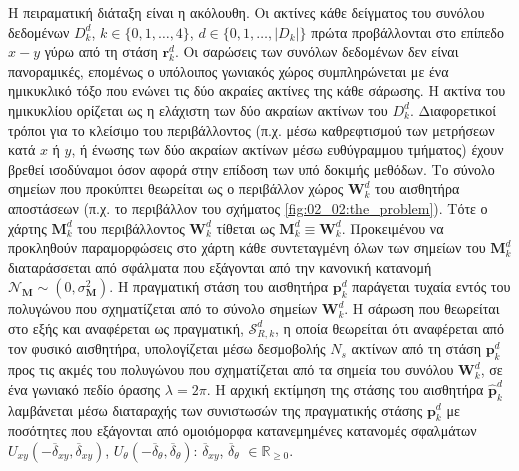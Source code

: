 Η πειραματική διάταξη είναι η ακόλουθη. Οι ακτίνες κάθε δείγματος του συνόλου
δεδομένων $D_k^d$, $k \in \{0,1,\dots,4\}$, $d \in \{0,1,\dots,|D_k|\}$ πρώτα
προβάλλονται στο επίπεδο $x-y$ γύρω από τη στάση $\bm{r}_k^d$. Οι σαρώσεις των
συνόλων δεδομένων δεν είναι πανοραμικές, επομένως ο υπόλοιπος γωνιακός χώρος
συμπληρώνεται με ένα ημικυκλικό τόξο που ενώνει τις δύο ακραίες ακτίνες της
κάθε σάρωσης. Η ακτίνα του ημικυκλίου ορίζεται ως η ελάχιστη των δύο ακραίων
ακτίνων του $D_k^d$. Διαφορετικοί τρόποι για το κλείσιμο του περιβάλλοντος
(π.χ.  μέσω καθρεφτισμού των μετρήσεων κατά $x$ ή $y$, ή ένωσης των δύο ακραίων
ακτίνων μέσω ευθύγραμμου τμήματος) έχουν βρεθεί ισοδύναμοι όσον αφορά στην
επίδοση των υπό δοκιμής μεθόδων. Το σύνολο σημείων που προκύπτει θεωρείται ως ο
περιβάλλον χώρος $\bm{W}_k^d$ του αισθητήρα αποστάσεων (π.χ.  το περιβάλλον του
σχήματος \ref{fig:02_02:the_problem}). Τότε ο χάρτης $\bm{M}_k^d$ του
περιβάλλοντος $\bm{W}_k^d$ τίθεται ως $\bm{M}_k^d \equiv \bm{W}_k^d$.
Προκειμένου να προκληθούν παραμορφώσεις στο χάρτη κάθε συντεταγμένη όλων των
σημείων του $\bm{M}_k^d$ διαταράσσεται από σφάλματα που εξάγονται από την
κανονική κατανομή $\mathcal{N}_{\bm{M}} \sim (0, \sigma_{\bm{M}}^2)$.  Η
πραγματική στάση του αισθητήρα $\bm{p}_k^d$ παράγεται τυχαία εντός του
πολυγώνου που σχηματίζεται από το σύνολο σημείων $\bm{W}_k^d$.  Η σάρωση που
θεωρείται στο εξής και αναφέρεται ως πραγματική, $\mathcal{S}_{R,k}^d$, η οποία
θεωρείται ότι αναφέρεται από τον φυσικό αισθητήρα, υπολογίζεται μέσω δεσμοβολής
$N_s$ ακτίνων από τη στάση $\bm{p}_k^d$ προς τις ακμές του πολυγώνου που
σχηματίζεται από τα σημεία του συνόλου $\bm{W}_k^d$, σε ένα γωνιακό πεδίο
όρασης $\lambda = 2\pi$. Η αρχική εκτίμηση της στάσης του αισθητήρα
$\hat{\bm{p}}_k^d$ λαμβάνεται μέσω διαταραχής των συνιστωσών της πραγματικής
στάσης $\bm{p}^d_k$ με ποσότητες που εξάγονται από ομοιόμορφα κατανεμημένες
κατανομές σφαλμάτων $U_{xy}(-\overline{\delta}_{xy}, \overline{\delta}_{xy})$,
$U_{\theta}(-\overline{\delta}_{\theta}, \overline{\delta}_{\theta})$:
$\overline{\delta}_{xy}$, $\overline{\delta}_\theta$ $\in \mathbb{R}_{\geq 0}$.

